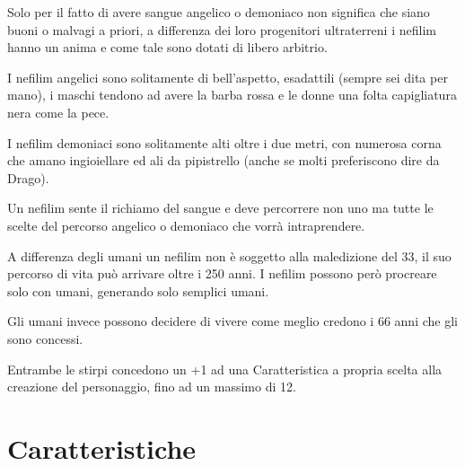 \documentclass[12pt,a4paper,twoside,openany]{book}
\begin{document}
\begin{multicols}{2}
Solo per il fatto di avere sangue angelico o demoniaco non significa che siano buoni o malvagi a priori, a differenza dei loro progenitori ultraterreni i nefilim hanno un anima e come tale sono dotati di libero arbitrio.

I nefilim angelici sono solitamente di bell'aspetto, esadattili (sempre sei dita per mano), i maschi tendono ad avere la barba rossa e le donne una folta capigliatura nera come la pece.

I nefilim demoniaci sono solitamente alti oltre i due metri, con numerosa corna che amano ingioiellare ed ali da pipistrello (anche se molti preferiscono dire da Drago).

Un nefilim sente il richiamo del sangue e deve percorrere non uno ma tutte le scelte del percorso angelico o demoniaco che vorrà intraprendere.

A differenza degli umani un nefilim non è soggetto alla maledizione del 33, il suo percorso di vita può arrivare oltre i 250 anni. I nefilim possono però procreare solo con umani, generando solo semplici umani.

Gli umani invece possono decidere di vivere come meglio credono i 66 anni che gli sono concessi.

Entrambe le stirpi concedono un +1 ad una Caratteristica a propria scelta alla creazione del personaggio, fino ad un massimo di 12.
	
\end{multicols}



\pagebreak

\section{Caratteristiche}
\end{document}
